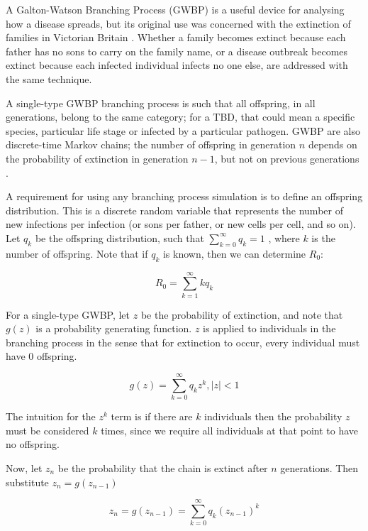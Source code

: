 \documentclass{article}
\begin{document}
A Galton-Watson Branching Process (GWBP) is a useful device for analysing how a disease spreads, but its original use was concerned with the extinction of families in Victorian Britain \cite{Athreya1972}. Whether a family becomes extinct because each father has no sons to carry on the family name, or a disease outbreak becomes extinct because each infected individual infects no one else, are addressed with the same technique.

A single-type GWBP branching process is such that all offspring, in all generations, belong to the same category; for a TBD, that could mean a specific species, particular life stage or infected by a particular pathogen. GWBP are also discrete-time Markov chains; the number of offspring in generation $ n $ depends on the probability of extinction in generation $ n - 1 $, but not on previous generations \cite{Allen2019}.

A requirement for using any branching process simulation is to define an offspring distribution. This is a discrete random variable that represents the number of new infections per infection (or sons per father, or new cells per cell, and so on). Let $ q_k $ be the offspring distribution, such that $ \sum_{k=0}^\infty q_k = 1 $ \cite{Diekman2000}, where $ k $ is the number of offspring.  Note that if $ q_k $ is known, then we can determine $ R_0 $:

\begin{equation}\label{offspringR0}
	R_0 = \sum_{k=1}^\infty k q_k
\end{equation}

For a single-type GWBP, let $ z $ be the probability of extinction, and note that $ g(z) $ is a probability generating function. $ z $ is applied to individuals in the branching process in the sense that for extinction to occur, every individual must have $ 0 $ offspring.

\begin{equation}\label{BranchingProcessPGF}
    g(z) = \sum_{k=0}^\infty q_k z^k, |z| < 1
\end{equation}

The intuition for the $ z^k $ term is if there are $ k $ individuals then the probability $ z $ must be considered $ k $ times, since we require all individuals at that point to have no offspring.

Now, let $ z_n $ be the probability that the chain is extinct after $ n $ generations. Then substitute $ z_n = g(z_{n-1})$

\begin{equation}\label{BranchingProcessRecurrence}
    z_{n} = g(z_{n-1}) = \sum_{k=0}^\infty q_k (z_{n-1})^k
\end{equation}
\end{document}
